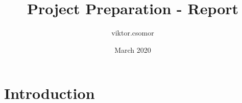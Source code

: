 \documentclass{article}
\title{Project Preparation - Report}
\author{viktor.csomor }
\date{March 2020}
\begin{document}
\maketitle

\section{Introduction}
\end{document}
